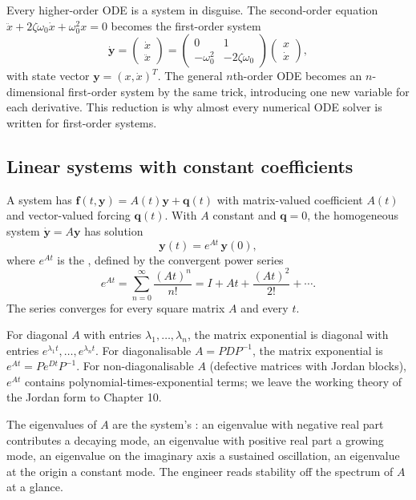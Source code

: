 Every higher-order ODE is a system in disguise. The second-order
equation $\ddot{x} + 2 \zeta \omega_{0} \dot{x} + \omega_{0}^{2} x =
0$ becomes the first-order system
\[
\dot{\mathbf{y}} = \begin{pmatrix} \dot{x} \\ \ddot{x} \end{pmatrix} = \begin{pmatrix} 0 & 1 \\ -\omega_{0}^{2} & -2\zeta\omega_{0} \end{pmatrix} \begin{pmatrix} x \\ \dot{x} \end{pmatrix},
\]
with state vector $\mathbf{y} = (x, \dot{x})^{T}$. The general
$n$th-order ODE becomes an $n$-dimensional first-order system by
the same trick, introducing one new variable for each derivative.
This reduction is why almost every numerical ODE solver is
written for first-order systems.

\subsection{Linear systems with constant coefficients}

A  system has $\mathbf{f}(t, \mathbf{y}) =
A(t)\mathbf{y} + \mathbf{q}(t)$ with matrix-valued coefficient
$A(t)$ and vector-valued forcing $\mathbf{q}(t)$. With $A$
constant and $\mathbf{q} = 0$, the homogeneous system $\dot{\mathbf{y}}
= A\mathbf{y}$ has solution
\[
\mathbf{y}(t) = e^{A t}\, \mathbf{y}(0),
\]
where $e^{A t}$ is the , defined by
the convergent power series
\[
e^{A t} = \sum_{n = 0}^{\infty} \frac{(A t)^{n}}{n!} = I + A t + \frac{(A t)^{2}}{2!} + \cdots.
\]
The series converges for every square matrix $A$ and every $t$.

For diagonal $A$ with entries $\lambda_{1}, \ldots, \lambda_{n}$,
the matrix exponential is diagonal with entries $e^{\lambda_{1} t},
\ldots, e^{\lambda_{n} t}$. For diagonalisable $A = P D P^{-1}$,
the matrix exponential is $e^{A t} = P e^{D t} P^{-1}$. For
non-diagonalisable $A$ (defective matrices with Jordan blocks),
$e^{A t}$ contains polynomial-times-exponential terms; we leave
the working theory of the Jordan form to Chapter 10.

The eigenvalues of $A$ are the system's : an
eigenvalue with negative real part contributes a decaying mode, an
eigenvalue with positive real part a growing mode, an eigenvalue
on the imaginary axis a sustained oscillation, an eigenvalue at the
origin a constant mode. The engineer reads stability off the
spectrum of $A$ at a glance.

